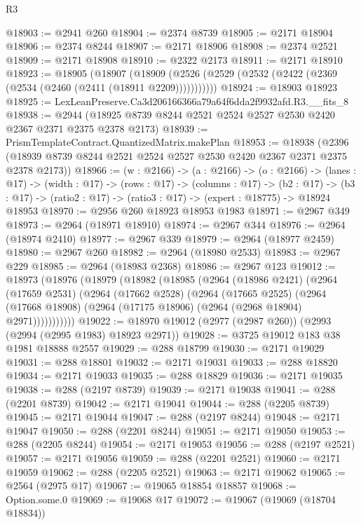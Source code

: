 \begin{lexlean}{R3}
\begin{coremodule}
@18903 := @2941 @260
@18904 := @2374 @8739
@18905 := @2171 @18904
@18906 := @2374 @8244
@18907 := @2171 @18906
@18908 := @2374 @2521
@18909 := @2171 @18908
@18910 := @2322 @2173
@18911 := @2171 @18910
@18923 := @18905
    (@18907 (@18909 (@2526 (@2529 (@2532 (@2422 (@2369 (@2534 (@2460 (@2411 (@18911 @2209)))))))))))
@18924 := @18903 @18923
@18925 := LexLeanPreserve.Ca3d206166366a79a64f6dda2f9932afd.R3.__fits_8
@18938 := @2944 (@18925 @8739 @8244 @2521 @2524 @2527 @2530 @2420 @2367 @2371 @2375 @2378 @2173)
@18939 := PrismTemplateContract.QuantizedMatrix.makePlan
@18953 := @18938
    (@2396 (@18939 @8739 @8244 @2521 @2524 @2527 @2530 @2420 @2367 @2371 @2375 @2378 @2173))
@18966 := (w : @2166) ->
  (a : @2166) ->
  (o : @2166) ->
  (lanes : @17) ->
  (width : @17) ->
  (rows : @17) ->
  (columns : @17) ->
  (b2 : @17) -> (b3 : @17) -> (ratio2 : @17) -> (ratio3 : @17) -> (expert : @18775) -> @18924 @18953
@18970 := @2956 @260 @18923 @18953 @1983
@18971 := @2967 @349
@18973 := @2964 (@18971 @18910)
@18974 := @2967 @344
@18976 := @2964 (@18974 @2410)
@18977 := @2967 @339
@18979 := @2964 (@18977 @2459)
@18980 := @2967 @260
@18982 := @2964 (@18980 @2533)
@18983 := @2967 @229
@18985 := @2964 (@18983 @2368)
@18986 := @2967 @123
@19012 := @18973
    (@18976
      (@18979
        (@18982
          (@18985
            (@2964
              (@18986 @2421)
              (@2964
                (@17659 @2531)
                (@2964
                  (@17662 @2528)
                  (@2964
                    (@17665 @2525)
                    (@2964
                      (@17668 @18908)
                      (@2964 (@17175 @18906) (@2964 (@2968 @18904) @2971)))))))))))
@19022 := @18970 @19012 (@2977 (@2987 @260)) (@2993 (@2994 (@2995 @1983) @18923 @2971))
@19028 := @3725 @19012 @183 @38 @1981 @18888 @2557
@19029 := @288 @18799
@19030 := @2171 @19029
@19031 := @288 @18801
@19032 := @2171 @19031
@19033 := @288 @18820
@19034 := @2171 @19033
@19035 := @288 @18829
@19036 := @2171 @19035
@19038 := @288 (@2197 @8739)
@19039 := @2171 @19038
@19041 := @288 (@2201 @8739)
@19042 := @2171 @19041
@19044 := @288 (@2205 @8739)
@19045 := @2171 @19044
@19047 := @288 (@2197 @8244)
@19048 := @2171 @19047
@19050 := @288 (@2201 @8244)
@19051 := @2171 @19050
@19053 := @288 (@2205 @8244)
@19054 := @2171 @19053
@19056 := @288 (@2197 @2521)
@19057 := @2171 @19056
@19059 := @288 (@2201 @2521)
@19060 := @2171 @19059
@19062 := @288 (@2205 @2521)
@19063 := @2171 @19062
@19065 := @2564 (@2975 @17)
@19067 := @19065 @18854 @18857
@19068 := Option.some.{0}
@19069 := @19068 @17
@19072 := @19067 (@19069 (@18704 @18834))

\end{coremodule}
\end{lexlean}
